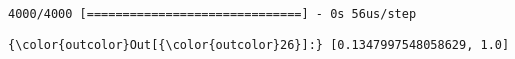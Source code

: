 \documentclass[11pt]{article}
\begin{document}
    \begin{Verbatim}[commandchars=\\\{\}]
4000/4000 [==============================] - 0s 56us/step

    \end{Verbatim}

\begin{Verbatim}[commandchars=\\\{\}]
{\color{outcolor}Out[{\color{outcolor}26}]:} [0.1347997548058629, 1.0]
\end{Verbatim}
            

    
    
    
    
\end{document}
